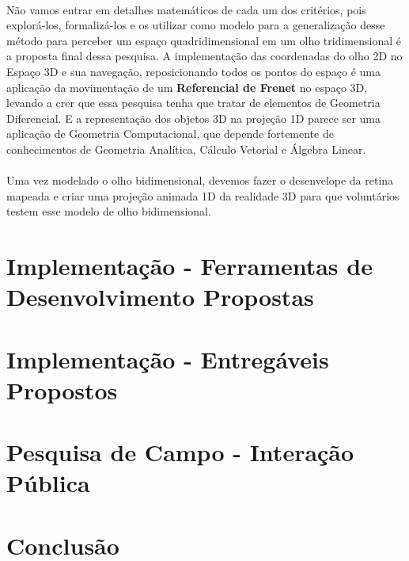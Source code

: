 \documentclass{article}
\begin{document}
	\paragraph{}
	Não vamos entrar em detalhes matemáticos de cada um dos critérios, pois explorá-los, formalizá-los e os utilizar como modelo para a generalização desse método para perceber um espaço quadridimensional em um olho tridimensional é a proposta final dessa pesquisa. A implementação das coordenadas do olho 2D no Espaço 3D e sua navegação, reposicionando todos os pontos do espaço é uma aplicação da movimentação de um \textbf{Referencial de Frenet} no espaço 3D, levando a crer que essa pesquisa tenha que tratar de elementos de Geometria Diferencial. E a representação dos objetos 3D na projeção 1D parece ser uma aplicação de Geometria Computacional, que depende fortemente de conhecimentos de Geometria Analítica, Cálculo Vetorial e Álgebra Linear.
	
	\paragraph{}
	Uma vez modelado o olho bidimensional, devemos fazer o desenvelope da retina mapeada e criar uma projeção animada 1D da realidade 3D para que voluntários testem esse modelo de olho bidimensional. 
		
	\section{Implementação - Ferramentas de Desenvolvimento Propostas} \label{if}
	\paragraph{}
	
	\section{Implementação - Entregáveis Propostos} \label{ie}
	\paragraph{}
	
	\section{Pesquisa de Campo - Interação Pública} \label{pc}
	\paragraph{}

	\section{Conclusão} \label{c}
	\paragraph{}
		
	
	
\end{document}
